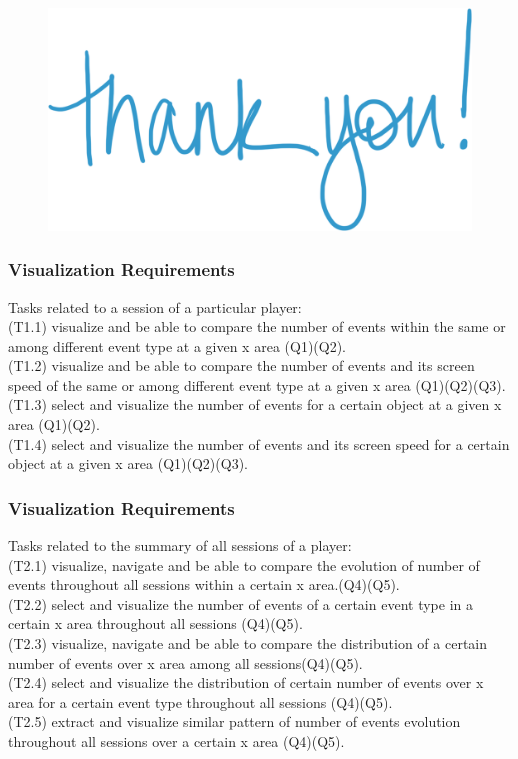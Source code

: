 \documentclass[xcolor=table]{beamer}
\begin{document}
\begin{frame}
\frametitle{}
\begin{figure}
\includegraphics[scale=0.5]{images/thank_you.png}
\end{figure}
\end{frame}

\begin{frame}
\frametitle{Visualization Requirements}
Tasks related to a session of a particular player:\\
(T1.1) visualize and be able to compare the number of events within the same or among different event type at a given x area (Q1)(Q2). \\
(T1.2) visualize and be able to compare the number of events and its screen speed of the same or among different event type at a given x area (Q1)(Q2)(Q3). \\
(T1.3) select and visualize the number of events for a certain object at a given x area (Q1)(Q2). \\
(T1.4) select and visualize the number of events and its screen speed for a certain object at a given x area (Q1)(Q2)(Q3). 
\end{frame}

\begin{frame}
\frametitle{Visualization Requirements}
Tasks related to the summary of all sessions of a player:\\
(T2.1) visualize, navigate and be able to compare the evolution of number of events throughout all sessions within a certain x area.(Q4)(Q5). \\
(T2.2) select and visualize the number of events of a certain event type in a certain x area throughout all sessions (Q4)(Q5).\\ 
(T2.3) visualize, navigate and be able to compare the distribution of a certain number of events over x area among all sessions(Q4)(Q5). \\
(T2.4) select and visualize the distribution of certain number of events over x area for a certain event type throughout all sessions (Q4)(Q5). \\
(T2.5) extract and visualize similar pattern of number of events evolution throughout all sessions over a certain x area (Q4)(Q5).
\end{frame}
\end{document}

